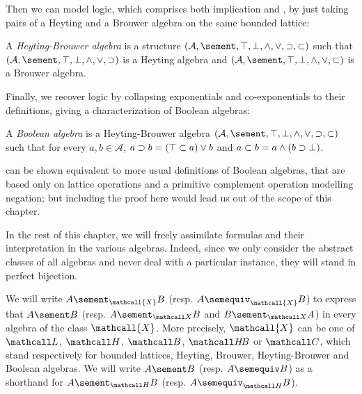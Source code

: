 Then we can model  logic, which comprises both implication and
, by just taking pairs of a Heyting and a Brouwer algebra on the same
bounded lattice:

\begin{definition}
  A \emph{Heyting-Brouwer algebra} is a structure $(\mathcal{A}, \sement, \ltop,
  \lbot, \lmeet, \ljoin, \lexp, \lcoexp)$ such that $(\mathcal{A}, \sement,
  \ltop, \lbot, \lmeet, \ljoin, \lexp)$ is a Heyting algebra and $(\mathcal{A},
  \sement, \ltop, \lbot, \lmeet, \ljoin, \lcoexp)$ is a Brouwer algebra.
\end{definition}

Finally, we recover  logic by collapsing exponentials and
co-exponentials to their  definitions, giving a characterization of
Boolean algebras:

\begin{definition}
  A \emph{Boolean algebra} is a Heyting-Brouwer algebra $(\mathcal{A}, \sement,
  \ltop, \lbot, \lmeet, \ljoin, \lexp, \lcoexp)$ such that for every $a, b \in
  \mathcal{A}$, $a \supset b = (\top \subset a) \lor b$ and $a \subset b = a
  \land (b \supset \bot)$.
\end{definition}

\begin{remark}
 can be shown equivalent to more
usual definitions of Boolean algebras, that are based only on lattice operations
and a primitive complement operation modelling negation; but including the proof
here would lead us out of the scope of this chapter.
\end{remark}

In the rest of this chapter, we will freely assimilate formulas and their
interpretation in the various algebras. Indeed, since we only consider the
abstract classes of all algebras and never deal with a particular instance,
they will stand in perfect bijection.

\begin{definition}
  We will write $A \sement_{\mathcall{X}} B$ (resp. $A \semequiv_{\mathcall{X}}
  B$) to express that $A \sement B$ (resp. $A \sementX B$ and $B \sementX A$) in
  every algebra of the class $\mathcall{X}$. More precisely, $\mathcall{X}$ can
  be one of $\Lattice$, $\Heyting$, $\Brouwer$, $\HeytingBrouwer$ or $\Boolean$,
  which stand respectively for bounded lattices, Heyting, Brouwer,
  Heyting-Brouwer and Boolean algebras. We will write $A \sement B$ (resp. $A
  \semequiv B$) as a shorthand for $A \sementH B$ (resp. $A \semequiv_{\Heyting}
  B$).
\end{definition}

